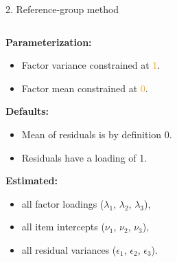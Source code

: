 \documentclass[10pt]{beamer}\usepackage[]{graphicx}\usepackage[]{xcolor}
\begin{document}
%
\begin{frame}{2. Reference-group method}

    \begin{columns}[T] %
    \begin{column}{.65\textwidth}
    
    \textbf{Parameterization:}
        \begin{itemize}
            \item Factor variance constrained at \textcolor{orange}{1}.
            \item Factor mean constrained at \textcolor{orange}{0}.
        \end{itemize} 
        \textbf{Defaults:}
        \begin{itemize}
            \item Mean of residuals is by definition 0.
            \item Residuals have a loading of 1.
        \end{itemize} 
        \textbf{Estimated:}
        \begin{itemize}
            \item all factor loadings ($\lambda_1$, $\lambda_2$, $\lambda_3$),
            \item all item intercepts ($\nu_1$, $\nu_2$, $\nu_3$), 
            \item all residual variances ($\epsilon_1$, $\epsilon_2$, $\epsilon_3$).
        \end{itemize}
    
    \end{column}%
    

\end{columns}
\end{frame}
\end{document}
